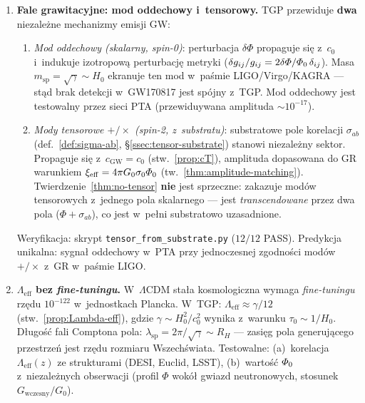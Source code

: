 \begin{enumerate}[nosep]
  \item \textbf{Fale grawitacyjne: mod oddechowy i~tensorowy.}
        TGP przewiduje \textbf{dwa} niezale\.zne mechanizmy emisji GW:
        \begin{enumerate}[nosep]
          \item \emph{Mod oddechowy (skalarny, spin-0)}: perturbacja
                $\delta\Phi$ propaguje si\k{e} z~$c_0$ i~indukuje
                izotropow\k{a} perturbacj\k{e} metryki
                ($\delta g_{ij}/g_{ij} = 2\delta\varPhi/\varPhi_0\,\delta_{ij}$).
                Masa $m_{\mathrm{sp}} = \sqrt{\gamma} \sim H_0$
                ekranuje ten mod w~pa\'smie LIGO/Virgo/KAGRA ---
                st\k{a}d brak detekcji w~GW170817 jest sp\'ojny z~TGP.
                Mod oddechowy jest testowalny przez sieci PTA
                (prze\-widuywana amplituda $\sim 10^{-17}$).
          \item \emph{Mody tensorowe $+/\times$ (spin-2, z~substratu)}:
                substratowe pole korelacji $\sigma_{ab}$ (def.~\ref{def:sigma-ab},
                \S\ref{ssec:tensor-substrate}) stanowi niezale\.zny sektor.
                Propaguje si\k{e} z~$c_{\mathrm{GW}} = c_0$ (stw.~\ref{prop:cT}),
                amplituda dopasowana do GR warunkiem
                $\xi_{\mathrm{eff}} = 4\pi G_0\sigma_0\varPhi_0$
                (tw.~\ref{thm:amplitude-matching}).
                Twierdzenie~\ref{thm:no-tensor} \textbf{nie} jest sprzeczne:
                zakazuje mod\'ow tensorowych z~jednego pola skalarnego ---
                jest \emph{transcendowane} przez dwa pola
                ($\Phi + \sigma_{ab}$), co jest w~pe\l{}ni
                substratowo uzasadnione.
        \end{enumerate}
        Weryfikacja: skrypt \texttt{tensor\_from\_substrate.py}
        ($12/12$ PASS). Predykcja unikalna: sygna\l{} oddechowy w~PTA
        przy jednoczesnej zgodno\'sci mod\'ow $+/\times$ z~GR
        w~pa\'smie LIGO.

  \item \textbf{$\Lambda_{\mathrm{eff}}$ bez \emph{fine-tuningu}.}
        W~$\Lambda$CDM sta\l{}a kosmologiczna wymaga
        \emph{fine-tuningu} rz\k{e}du $10^{-122}$ w~jednostkach
        Plancka. W~TGP: $\Lambda_{\mathrm{eff}} \approx \gamma/12$
        (stw.~\ref{prop:Lambda-eff}), gdzie $\gamma \sim H_0^2/c_0^2$
        wynika z~warunku $\tau_0 \sim 1/H_0$.
        D\l{}ugo\'s\'c fali Comptona pola:
        $\lambda_{\mathrm{sp}} = 2\pi/\sqrt{\gamma} \sim R_H$
        --- zasi\k{e}g pola generuj\k{a}cego przestrze\'n
        jest rz\k{e}du rozmiaru Wszech\'swiata.
        Testowalne: (a)~korelacja $\Lambda_{\mathrm{eff}}(z)$
        ze strukturami (DESI, Euclid, LSST),
        (b)~warto\'s\'c $\varPhi_0$ z~niezale\.znych
        obserwacji (profil $\Phi$ wok\'o\l{} gwiazd neutronowych,
        stosunek $G_{\mathrm{wczesny}}/G_0$).


\end{enumerate}
